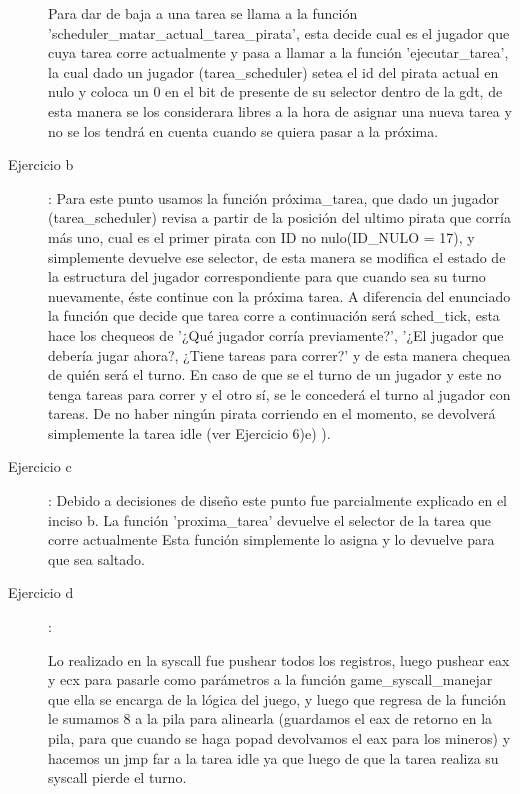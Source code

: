 \documentclass[a4paper]{article}
\begin{document}
\begin{description}
Para dar de baja a una tarea se llama a la función 'scheduler_matar_actual_tarea_pirata', esta decide cual es el jugador que cuya tarea corre actualmente y pasa a llamar a la función 'ejecutar_tarea', la cual dado un jugador (tarea_scheduler) setea el id del pirata actual en nulo y coloca un 0 en el bit de presente de su selector dentro de la gdt, de esta manera se los considerara libres a la hora de asignar una nueva tarea y no se los tendrá en cuenta cuando se quiera pasar a la próxima.
 
  
  \item[Ejercicio b] :\newline
  Para este punto usamos la función próxima_tarea, que dado un jugador (tarea_scheduler) revisa a partir de la posición del ultimo pirata que corría más uno, cual es el primer pirata con ID no nulo(ID_NULO = 17), y simplemente devuelve ese selector, de esta manera se modifica el estado de la estructura del jugador correspondiente para que cuando sea su turno nuevamente, éste continue con la próxima tarea. A diferencia del enunciado la función que decide que tarea corre a continuación será sched_tick, esta hace los chequeos de '¿Qué jugador corría previamente?', '¿El jugador que debería jugar ahora?, ¿Tiene tareas para correr?' y de esta manera chequea de quién será el turno. En caso de que se el turno de un jugador y este no tenga tareas para correr y el otro sí, se le concederá el turno al jugador con tareas. De no haber ningún pirata corriendo en el momento, se devolverá simplemente la tarea idle (ver Ejercicio 6)e) ).
  \item[Ejercicio c] :\newline
    Debido a decisiones de diseño este punto fue parcialmente explicado en el inciso b.
    La función 'proxima_tarea' devuelve el selector de la tarea que corre actualmente Esta función simplemente lo asigna y lo devuelve para que sea saltado.
  \item[Ejercicio d] :\newline
  
  Lo realizado en la syscall fue pushear todos los registros, luego pushear eax y ecx para pasarle como parámetros a la función game_syscall_manejar que ella se encarga de la lógica del juego, y luego que regresa de la función le sumamos 8 a la pila para alinearla (guardamos el eax de retorno en la pila, para que cuando se haga popad devolvamos el eax para los mineros) y hacemos un jmp far a la tarea idle ya que luego de que la tarea realiza su syscall pierde el turno.
  

\end{description}
\end{document}
